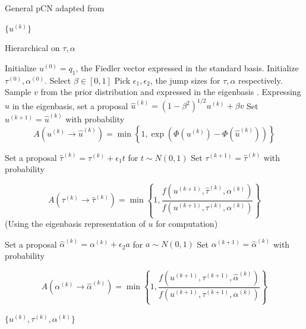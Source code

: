 \documentclass{siamart1116}
\begin{document}
\begin{algorithm}
\caption{General pCN adapted from \cite{CoRoStWh13}}
\label{alg:generalpCN}
\begin{algorithmic}
\EndFor
\State \Return $\{u^{(k)}\}$
\end{algorithmic}
\end{algorithm}

\begin{algorithm}
\caption{Hierarchical on $\tau, \alpha$}
\label{alg:hierarchical_tau_alpha}
\begin{algorithmic}
\State Initialize $u^{(0)} = q_1$, the Fiedler vector expressed in the standard basis.
\State Initialize $\tau^{(0)}, \alpha^{(0)}$. Select $\beta \in [0, 1]$
\State Pick $\epsilon_1, \epsilon_2$, the jump sizes for $\tau, \alpha$ respectively.
\State Sample $v$ from the prior distribution and expressed in the eigenbasis .
\State Expressing $u$ in the eigenbasis, set a proposal $\hat u^{(k)} = (1- \beta^2)^{1/2}u^{(k)} + \beta v$
\State Set $u^{(k+1)} = \hat u^{(k)}$ with probability 
\[A(u^{(k)} \to \hat u^{(k)}) = \min \left\{1, \exp(\Phi(u^{(k)}) - \Phi(\hat u^{(k)})) \right\}\]

\State Set a proposal $\hat \tau^{(k)} = \tau^{(k)} + \epsilon_1 t$ for $t \sim N(0, 1)$ 
\State Set $\tau^{(k+1)} = \hat \tau^{(k)}$ with probability 

\[A(\tau^{(k)} \to \hat \tau^{(k)}) = \min \left\{ 1, \frac{f(u^{(k+1)}, \hat \tau^{(k)}, \alpha^{(k)})}{f(u^{(k+1)}, \tau^{(k)}, \alpha^{(k)})}\right\}\]
(Using the eigenbasis representation of $u$ for computation) 

\State Set a proposal $\hat \alpha^{(k)} = \alpha^{(k)} + \epsilon_2 a$ for $a \sim N(0, 1)$ 
\State Set $\alpha^{(k+1)} = \hat \alpha^{(k)}$ with probability

 \[A(\alpha^{(k)}\to\hat\alpha^{(k)}) = 
 \min\left\{1, 
 \frac{f(u^{(k+1)}, \tau^{(k+1)}, \hat \alpha^{(k)})}
 {f(u^{(k+1)}, \tau^{(k+1)}, \alpha^{(k)})}\right\}
 \]


\EndFor
\State \Return $\{u^{(k)}, \tau^{(k)}, \alpha^{(k)}\}$
\end{algorithmic}
\end{algorithm}
\end{document}
